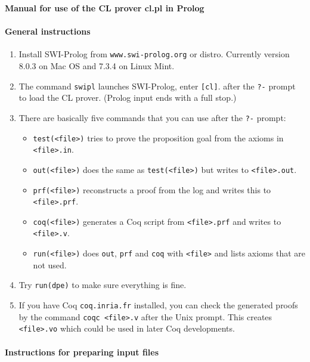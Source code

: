 \documentclass{article}
\begin{document}
\begin{center}
\textbf{Manual for use of the CL prover cl.pl in Prolog}
\end{center}

\paragraph{General instructions}

\begin{enumerate}
\item Install SWI-Prolog from \texttt{www.swi-prolog.org} or distro.
Currently version 8.0.3 on Mac OS and 7.3.4 on Linux Mint.
\item The command \texttt{swipl} launches SWI-Prolog,
enter \texttt{[cl]}. after the \texttt{?-} prompt to load the CL prover.
(Prolog input ends with a full stop.)
\item There are basically five commands that you can use after the
  \texttt{?-} prompt:
\begin{itemize}
\item \texttt{test(<file>)} tries to prove the proposition goal from
  the axioms in \texttt{<file>.in}.
\item \texttt{out(<file>)} does the same as \texttt{test(<file>)} but
  writes to \texttt{<file>.out}.
\item \texttt{prf(<file>)} reconstructs a proof from the log and
  writes this to \texttt{<file>.prf}.
\item \texttt{coq(<file>)} generates a Coq script from
  \texttt{<file>.prf} and writes to \texttt{<file>.v}.
\item \texttt{run(<file>)} does \texttt{out}, \texttt{prf} and
  \texttt{coq} with \texttt{<file>} and lists axioms that are not used.
\end{itemize}
\item Try \texttt{run(dpe)} to make sure everything is fine.   
\item If you have Coq \texttt{coq.inria.fr} installed, 
  you can check the generated proofs by the command \texttt{coqc <file>.v}
  after the Unix prompt. This creates \texttt{<file>.vo} which could
  be used in later Coq developments.
\end{enumerate}


\paragraph{Instructions for preparing input files}
\end{document}
